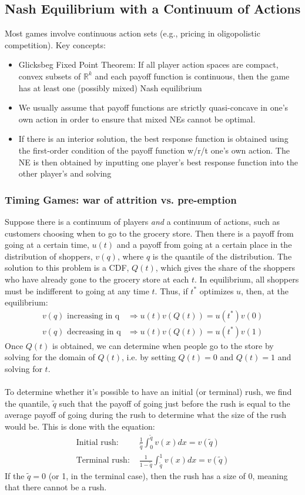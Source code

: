 \documentclass{article}
\newcommand{\R}{\mathbb{R}}
\begin{document}
\subsection{Nash Equilibrium with a Continuum of Actions}
Most games involve continuous action sets (e.g., pricing in oligopolistic competition). Key concepts:
\begin{itemize}
	\item Glicksbeg Fixed Point Theorem: If all player action spaces are compact, convex subsets of $\R^k$ and each payoff function is continuous, then the game has at least one (possibly mixed) Nash equilibrium
	\item We usually assume that payoff functions are strictly quasi-concave in one's own action in order to ensure that mixed NEs cannot be optimal. 
	\item If there is an interior solution, the best response function is obtained using the first-order condition of the payoff function w/r/t one's own action. The NE is then obtained by inputting one player's best response function into the other player's and solving
\end{itemize}

\subsubsection{Timing Games: war of attrition vs. pre-emption}
Suppose there is a continuum of players \textit{and} a continuum of actions, such as customers choosing when to go to the grocery store. Then there is a payoff from going at a certain time, $u(t)$ and a payoff from going at a certain place in the distribution of shoppers, $v(q)$, where $q$ is the quantile of the distribution. The solution to this problem is a CDF, $Q(t)$, which gives the share of the shoppers who have already gone to the grocery store at each $t$. In equilibrium, all shoppers must be indifferent to going at any time $t$. Thus, if $t^*$ optimizes $u$, then, at the equilibrium:
	\begin{align*}
		v(q)\text{ increasing in q} &\Rightarrow u(t)v\left(Q(t)\right) = u(t^*)v(0)	\\
		v(q)\text{ decreasing in q} &\Rightarrow u(t)v\left(Q(t)\right) = u(t^*)v(1)
	\end{align*}
	Once $Q(t)$ is obtained, we can determine when people go to the store by solving for the domain of $Q(t)$, i.e. by setting ${Q(t)=0}$ and ${Q(t)=1}$ and solving for $t$. \\
	\\
	To determine whether it's possible to have an initial (or terminal) rush, we find the quantile, $\tilde{q}$ such that the payoff of going just before the rush is equal to the average payoff of going during the rush to determine what the size of the rush would be.  This is done with the equation:
	\begin{align*}
		\text{Initial rush: }  & \frac{1}{\tilde{q}}\int^{\tilde{q}}_0v(x)dx = v(\tilde{q})	\\
		\text{Terminal rush: } & \frac{1}{1-\tilde{q}}\int^{1}_{\tilde{q}}v(x)dx = v(\tilde{q})
	\end{align*}
	If the ${\tilde{q}=0}$ (or 1, in the terminal case), then the rush has a size of 0, meaning that there cannot be a rush.
\end{document}
